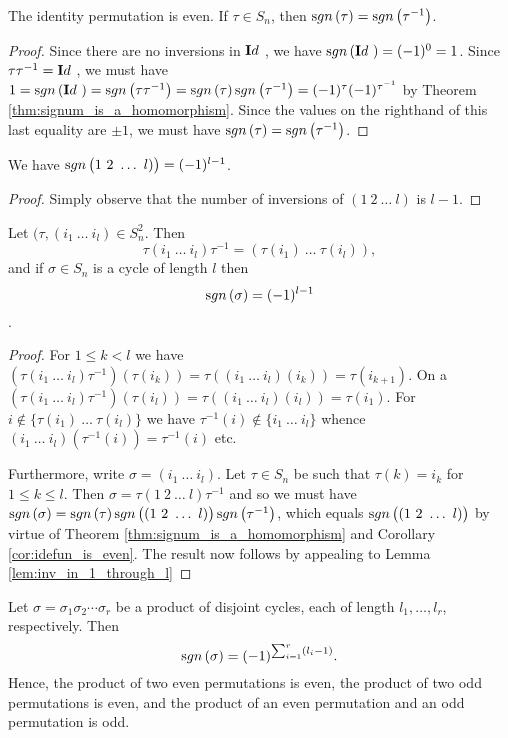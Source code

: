 \begin{cor}
The identity permutation is even. If $\tau\in S_n$, then
$\sgn{\tau} = \sgn{\tau^{-1}}$.
\label{cor:idefun_is_even}\end{cor}
\begin{proof}
Since there are no inversions in ${\mathbf Id\ }$, we have $\sgn{\idefun}
= (-1)^0 = 1$. Since $\tau\tau^{-1} = {\mathbf Id\ }$, we must have $1 =
\sgn{\idefun} = \sgn{\tau\tau^{-1}} = \sgn{\tau}\sgn{\tau^{-1}} =
(-1)^\tau (-1)^{\tau^{-1}}$ by Theorem
\ref{thm:signum_is_a_homomorphism}. Since the values on the
righthand of this last equality are $\pm 1$, we must have
$\sgn{\tau}=\sgn{\tau^{-1}}$.
\end{proof}
\begin{lemma}
We have $\sgn{1\ 2\ \ldots\ l)}=(-1)^{l-1}$.
\label{lem:inv_in_1_through_l}\end{lemma}
\begin{proof}
Simply observe that the number of inversions of $(1\ 2\ \ldots\
l)$ is $l- 1$.
\end{proof}
\begin{lemma} \label{lem:signum_through_cycles}
Let $(\tau, (i_1\ \ldots\ i_l)\in S_n ^2$. Then
$$
\tau(i_1\ \ldots\ i_l)\tau^{-1} = (\tau(i_1)\ \ldots\
\tau(i_l)),$$ and if $\sigma\in S_n$ is a  cycle of length $l$
then
$$\sgn{\sigma}=(-1)^{l-1}$$.\\
\end{lemma}
\begin{proof}
For $1\leq k<l$ we have $(\tau(i_1\ \ldots\
i_l)\tau^{-1})(\tau(i_k)) = \tau((i_1\ \ldots\ i_l)(i_k)) =
\tau(i_{k+1})$. On a $(\tau(i_1\ \ldots\ i_l)\tau^{-1})(\tau(i_l))
= \tau((i_1\ \ldots\ i_l)(i_l)) = \tau(i_1)$. For
$i\not\in\{\tau(i_1)\ \ldots\ \tau(i_l)\}$ we have
$\tau^{-1}(i)\not\in\{i_1\ \ldots\ i_l\}$ whence $(i_1\ \ldots\
i_l)(\tau^{-1}(i))=\tau^{-1}(i)$ etc.

\bigskip

Furthermore, write $\sigma=(i_1\ \ldots\ i_l)$. Let $\tau\in S_n$
be such that  $\tau(k)=i_k$ for $1\leq k\leq l$. Then
$\sigma=\tau(1\ 2\ \ldots\ l)\tau^{-1}$ and so we must have
$\sgn{\sigma} = \sgn{\tau}\sgn{(1\ 2\ \ldots\ l)}\sgn{\tau^{-1}}$,
which equals  $\sgn{(1\ 2\ \ldots\ l)}$ by virtue of Theorem
\ref{thm:signum_is_a_homomorphism} and Corollary
\ref{cor:idefun_is_even}. The result now follows by appealing to
Lemma \ref{lem:inv_in_1_through_l}
\end{proof}
\begin{cor}\label{cor:signum_through_bikes}
Let $\sigma=\sigma_1\sigma_2\cdots\sigma_r$ be a product of
disjoint cycles, each of length  $l_1,\ldots,l_r$, respectively.
Then
$$
\sgn{\sigma} = (-1)^{\sum_{i=1}^r (l_i-1)}.
$$Hence, the product of two even permutations is even, the product
of two odd permutations is even, and the product of an even
permutation and an odd permutation is odd.
\end{cor}

